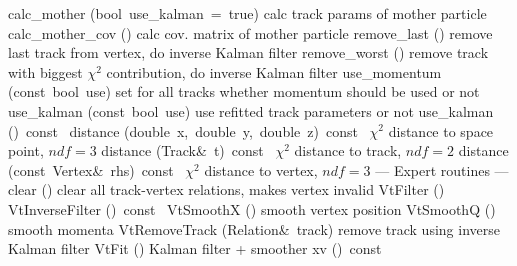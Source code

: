 \documentclass{article}
\begin{document}
\begin{cxxentry}
\begin{cxxclass}
\begin{cxxpublic}
        {calc\_mother}
        {(bool\ use\_kalman\ =\ true)}
        { calc track params of mother particle}
        {}
\label{cxx.1.2.69}
        {calc\_mother\_cov}
        {()}
        { calc cov. matrix of mother particle}
        {}
\label{cxx.1.2.70}
        {remove\_last}
        {()}
        { remove last track from vertex, do inverse Kalman filter}
        {}
\label{cxx.1.2.71}
        {remove\_worst}
        {()}
        { remove track with biggest $\chi^2$ contribution, do inverse Kalman filter}
        {}
\label{cxx.1.2.72}
        {use\_momentum}
        {(const\ bool\ use)}
        { set for all tracks whether momentum should be used or not}
        {}
\label{cxx.1.2.73}
        {use\_kalman}
        {(const\ bool\ use)}
        { use refitted track parameters or not}
        {}
\label{cxx.1.2.74}
        {use\_kalman}
        {()\ const\ }
        {}
        {}
\label{cxx.1.2.75}
        {distance}
        {(double\ x,\ double\ y,\ double\ z)\ const\ }
        { $\chi^2$ distance to space point, $ndf = 3$}
        {}
\label{cxx.1.2.76}
        {distance}
        {(Track\&\ t)\ const\ }
        { $\chi^2$ distance to track, $ndf = 2$}
        {}
\label{cxx.1.2.77}
        {distance}
        {(const\ Vertex\&\ rhs)\ const\ }
        { $\chi^2$ distance to vertex, $ndf = 3$}
        {}
\label{cxx.1.2.78}
\cxxitem{}
        {--- Expert routines --- }
        {}
        {}
        {}
\label{cxx.1.2.79}
        {clear}
        {()}
        { clear all track-vertex relations, makes vertex invalid}
        {}
\label{cxx.1.2.80}
        {VtFilter}
        {()}
        {}
        {}
\label{cxx.1.2.81}
        {VtInverseFilter}
        {()\ const\ }
        {}
        {}
\label{cxx.1.2.82}
        {VtSmoothX}
        {()}
        { smooth vertex position}
        {}
\label{cxx.1.2.83}
        {VtSmoothQ}
        {()}
        { smooth momenta}
        {}
\label{cxx.1.2.84}
        {VtRemoveTrack}
        {(Relation\&\ track)}
        { remove track using inverse Kalman filter}
        {}
\label{cxx.1.2.85}
        {VtFit}
        {()}
        { Kalman filter + smoother}
        {}
\label{cxx.1.2.86}
        {xv}
        {()\ const\ }
        {}
        {}
\label{cxx.1.2.87}

\end{cxxpublic}
\end{cxxclass}
\end{cxxentry}
\end{document}
